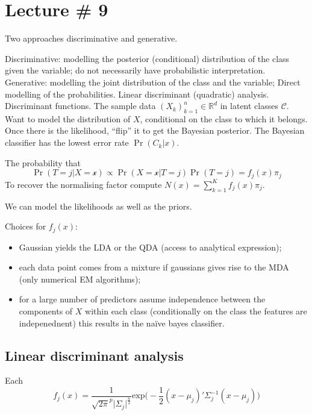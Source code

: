 \documentclass[a4paper]{article}
\newcommand{\Real}{\mathbb{R}}
\newcommand{\Ccal}{\mathcal{C}}
\begin{document}

\clearpage
\section{Lecture \# 9} %
\label{sec:lecture_9}

Two approaches discriminative and generative.

Discriminative: modelling the posterior (conditional) distribution of the class given the variable; do not necessarily have probabilistic interpretation.
Generative: modelling the joint distribution of the class and the variable;
Direct modelling of the probabilities.
Linear discriminant (quadratic) analysis.
Discriminant functions.
The sample data $(X_k)_{k=1}^n\in \Real^d$ in latent classes $\Ccal$. Want to model the distribution of $X$, conditional on the class to which it belongs.
Once there is the likelihood, ``flip'' it to get the Bayesian posterior. The Bayesian classifier has the lowest error rate $\Pr(C_k\vert x)$.

The probability that 
\[\Pr(T = j\vert X = \mathcal{x}) \propto \Pr(X = \mathcal{x}\vert T = j) \Pr( T = j ) = f_j(x) \pi_j\]
To recover the normalising factor compute $N(x) = \sum_{k=1}^K f_j(x) \pi_j$.

We can model the likelihoods as well as the priors.

Choices for $f_j(x)$: \begin{itemize}
	\item Gaussian yields the LDA or the QDA (access to analytical expression);
	\item each data point comes from a mixture if gaussians gives rise to the MDA (only numerical EM algorithms);
	\item for a large number of predictors assume independence between the components of $X$ within each class (conditionally on the class the features are indepenednent) this results in the na\"ive bayes classifier.
\end{itemize}


\subsection{Linear discriminant analysis} %
\label{sub:linear_discriminant_analysis}

Each
\[f_j(x) = \frac{1}{\sqrt{2\pi}^p \lvert \Sigma_j\rvert^\frac{n}{2}} \text{exp}\bigg(-\frac{1}{2}(x-\mu_j)'\Sigma_j^{-1}(x-\mu_j)\bigg)\]
\end{document}
